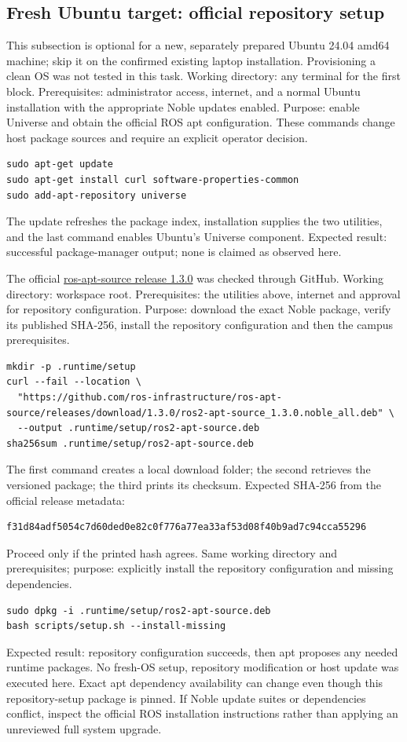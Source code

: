 \subsection{Fresh Ubuntu target: official repository setup}
This subsection is optional for a new, separately prepared Ubuntu 24.04 amd64 machine; skip it on the confirmed existing laptop installation. Provisioning a clean OS was not tested in this task. Working directory: any terminal for the first block. Prerequisites: administrator access, internet, and a normal Ubuntu installation with the appropriate Noble updates enabled. Purpose: enable Universe and obtain the official ROS apt configuration. These commands change host package sources and require an explicit operator decision.
\begin{lstlisting}
sudo apt-get update
sudo apt-get install curl software-properties-common
sudo add-apt-repository universe
\end{lstlisting}
The update refreshes the package index, installation supplies the two utilities, and the last command enables Ubuntu's Universe component. Expected result: successful package-manager output; none is claimed as observed here.

The official \href{https://github.com/ros-infrastructure/ros-apt-source/releases/tag/1.3.0}{ros-apt-source release 1.3.0} was checked through GitHub. Working directory: workspace root. Prerequisites: the utilities above, internet and approval for repository configuration. Purpose: download the exact Noble package, verify its published SHA-256, install the repository configuration and then the campus prerequisites.
\begin{lstlisting}
mkdir -p .runtime/setup
curl --fail --location \
  "https://github.com/ros-infrastructure/ros-apt-source/releases/download/1.3.0/ros2-apt-source_1.3.0.noble_all.deb" \
  --output .runtime/setup/ros2-apt-source.deb
sha256sum .runtime/setup/ros2-apt-source.deb
\end{lstlisting}
The first command creates a local download folder; the second retrieves the versioned package; the third prints its checksum. Expected SHA-256 from the official release metadata:
\begin{lstlisting}
f31d84adf5054c7d60ded0e82c0f776a77ea33af53d08f40b9ad7c94cca55296
\end{lstlisting}
Proceed only if the printed hash agrees. Same working directory and prerequisites; purpose: explicitly install the repository configuration and missing dependencies.
\begin{lstlisting}
sudo dpkg -i .runtime/setup/ros2-apt-source.deb
bash scripts/setup.sh --install-missing
\end{lstlisting}
Expected result: repository configuration succeeds, then apt proposes any needed runtime packages. No fresh-OS setup, repository modification or host update was executed here. Exact apt dependency availability can change even though this repository-setup package is pinned. If Noble update suites or dependencies conflict, inspect the official ROS installation instructions rather than applying an unreviewed full system upgrade.

